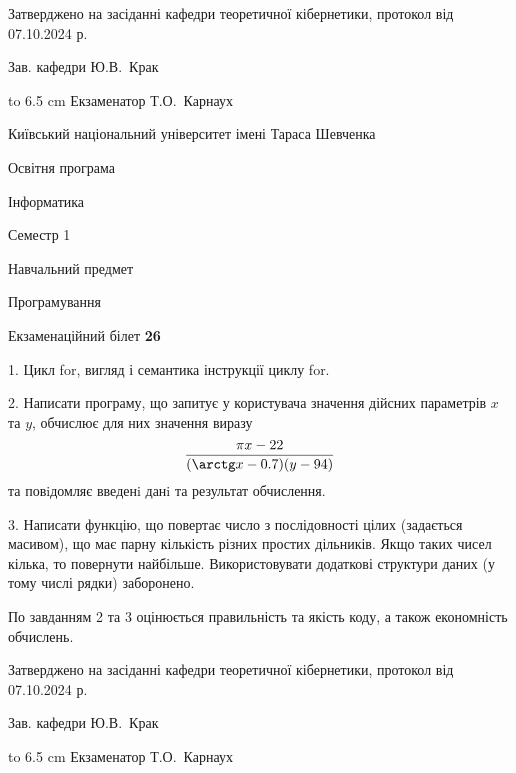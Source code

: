 \documentclass[12pt, ukrainian]{article}
\begin{document}
{\smallskip\smallskip \begin {scriptsize} Затверджено на засіданні кафедри теоретичної кібернетики, протокол   від   07.10.2024 р.\par\smallskip\smallskip\smallskip\smallskip
{\parbox {6.5 cm} {Зав. кафедри \dotfill Ю.В.~Крак}}\hspace {0.7cm} {\hbox to 6.5 cm { Екзаменатор \dotfill Т.О.~Карнаух}} \end{scriptsize}}
\vspace{0.9cm}
{{\begin {scriptsize}\par
{ \center  Київський національний університет імені Тараса Шевченка \par}
{\parbox {5 cm}{Освітня програма \hfill}{\parbox {7 cm}{Інформатика\hfill}}\parbox {6 cm}{\hfill Семестр 1}}\par
{\parbox {5 cm} {Навчальний предмет \hfill}\parbox {7 cm}{Програмування \hfill}\parbox {6cm}{\hfill}\par}\vspace{-15pt} \end{scriptsize}}{\center Екзаменаційний білет \No \textbf { 26 }\par}}
{%
1. Цикл for, вигляд і семантика інструкції циклу for.%
\par
2. Написати програму, що запитує у користувача значення дійсних параметрів $x$ та $y$, обчислює для них значення виразу 
$$\frac{\pi x - 22}{(\arctg x - 0.7) (y - 94)}$$ 
та повiдомляє введенi данi та результат обчислення.

\par
3. Написати функцію, що повертає число з послідовності цілих (задається масивом), що має парну кількість різних простих дільників. Якщо таких чисел кілька, то повернути найбільше. Використовувати додаткові структури даних (у тому числі рядки) заборонено.

По завданням 2 та 3 оцінюється правильність та якість коду, а також економність обчислень.

}
{\smallskip\smallskip \begin {scriptsize} Затверджено на засіданні кафедри теоретичної кібернетики, протокол   від   07.10.2024 р.\par\smallskip\smallskip\smallskip\smallskip
{\parbox {6.5 cm} {Зав. кафедри \dotfill Ю.В.~Крак}}\hspace {0.7cm} {\hbox to 6.5 cm { Екзаменатор \dotfill Т.О.~Карнаух}} \end{scriptsize}}
\vspace{0.9cm}
\end{document}
